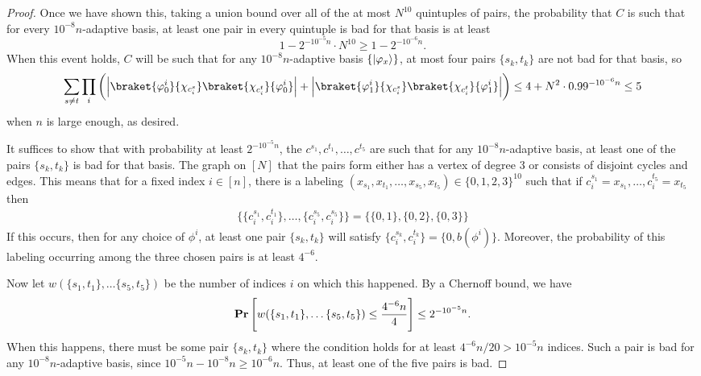 \begin{proof}
    Once we have shown this, taking a union bound over all of the at most $N^{10}$ quintuples of pairs, the probability that $C$ is such that for every $10^{-8}n$-adaptive basis, at least one pair in every quintuple is bad for that basis is at least
    \[
        1-2^{-10^{-5}n}\cdot N^{10} \geq 1-2^{-10^{-6}n}.
    \]
    When this event holds, $C$ will be such that for any $10^{-8}n$-adaptive basis $\{\lvert\varphi_x\rangle\}$, at most four pairs $\{s_k,t_k\}$ are not bad for that basis, so
    \[
        \sum_{s\neq t}\prod_{i}\pbra{\abs{\braket{\smash{\phi^i_{0}}}{\chi_{c^s_i}}\braket{\chi_{c^t_i}}{\smash{\phi^i_{0}}}}+\abs{\braket{\smash{\phi^i_{1}}}{\chi_{c^s_i}}\braket{\chi_{c^t_i}}{\smash{\phi^i_{1}}}}} \leq 4+N^2\cdot 0.99^{-10^{-6}n} \leq 5
    \]
    when $n$ is large enough, as desired.
    
    It suffices to show that with probability at least $2^{-10^{-5}n}$, the $c^{s_1},c^{t_1},\dots,c^{t_5}$ are such that for any $10^{-8}n$-adaptive basis, at least one of the pairs $\{s_k,t_k\}$ is bad for that basis. The graph on $[N]$ that the pairs form either has a vertex of degree 3 or consists of disjoint cycles and edges. This means that for a fixed index $i\in[n]$, there is a labeling $(x_{s_1},x_{t_1},\dots,x_{s_5},x_{t_5})\in \{0,1,2,3\}^{10}$ such that if $c^{s_1}_i=x_{s_1},\dots,c^{t_5}_i=x_{t_5}$ then
    \begin{align*}
        \{\{c^{s_1}_i,c^{t_1}_i\},\dots,\{c^{s_5}_i,c^{s_5}_i\}\}=\{\{0,1\},\{0,2\},\{0,3\}\}
    \end{align*}
    If this occurs, then for any choice of $\phi^i$, at least one pair $\{s_k,t_k\}$ will satisfy $\{c^{s_k}_i,c^{t_k}_i\} = \{0, b(\phi^i)\}$. Moreover, the probability of this labeling occurring among the three chosen pairs is at least $4^{-6}$.

    Now let $w(\{s_1,t_1\},\dots \{s_5,t_5\})$ be the number of indices $i$ on which this happened. By a Chernoff bound, we have
    \begin{align*}
        \operatorname{{\bf Pr}}{\left[ w(\{s_1,t_1\},\dots \{s_5,t_5\}) \leq \frac{4^{-6}n}{4} \right]} \leq 2^{-10^{-5}n}.
    \end{align*}
    When this happens, there must be some pair $\{s_k,t_k\}$ where the condition holds for at least $4^{-6}n/20>10^{-5}n$ indices. Such a pair is bad for any $10^{-8}n$-adaptive basis, since $10^{-5}n-10^{-8}n\geq 10^{-6}n$. Thus, at least one of the five pairs is bad.
\end{proof}







